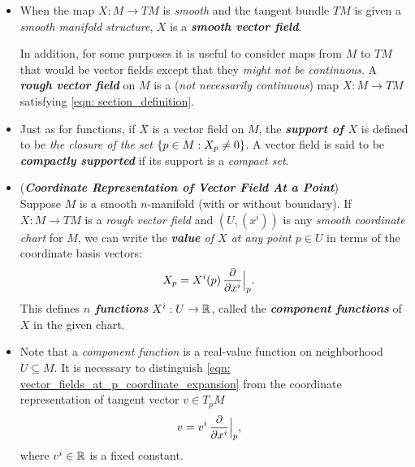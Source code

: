 \documentclass[11pt]{article}
\begin{document}
\begin{itemize}
\item \begin{definition}
When the map $X: M \rightarrow TM$ is \emph{smooth} and the tangent bundle $TM$ is given a \emph{smooth manifold structure},  $X$ is a \textbf{\emph{smooth vector field}}. 

In addition, for some purposes it is useful to consider maps from $M$ to $TM$ that would be vector fields except that they \emph{might not be continuous}. A \emph{\textbf{rough vector field}} on $M$ is a (\emph{not necessarily continuous}) map $X: M \rightarrow TM$ satisfying \eqref{eqn: section_definition}.
\end{definition}

\item \begin{definition}
Just as for functions, if $X$ is a vector field on $M$, the \emph{\textbf{support of $X$}} is defined to be \emph{the closure of the set} $\left\{p \in M: X_p \neq 0\right\}$. A vector field is said to be \emph{\textbf{compactly supported}} if its support is a \emph{compact set}.
\end{definition}

\item \begin{remark} (\emph{\textbf{Coordinate Representation of Vector Field At a Point}})\\
Suppose $M$ is a smooth $n$-manifold (with or without boundary). If $X: M \rightarrow TM$ is a \emph{rough vector field} and $(U, (x^i)) $ is any \emph{smooth coordinate chart} for $M$, we can write the \emph{\textbf{value} of $X$ at any point $p \in U$} in terms of the coordinate basis vectors:
\begin{align}
X_{p} &= X^{i}(p)\,\frac{\partial }{ \partial x^{i}}\Bigr|_{p}.  \label{eqn: vector_fields_at_p_coordinate_expansion}
\end{align} 
This defines \textbf{\emph{$n$ functions}} $X^i: U \rightarrow {\mathbb R}$, called the \emph{\textbf{component functions}} of $X$ in the given chart.
\end{remark}

\item Note that a \emph{component function} is a real-value function on neighborhood $U \subseteq M$. It is necessary to distinguish \eqref{eqn: vector_fields_at_p_coordinate_expansion} from the coordinate representation of tangent vector $v\in T_{p}M$
\begin{align*}
v &= v^{i}\,\frac{\partial }{ \partial x^{i}}\Bigr|_{p},
\end{align*} where $v^{i} \in {\mathbb R}$ is a fixed constant.


\end{itemize}
\end{document}
